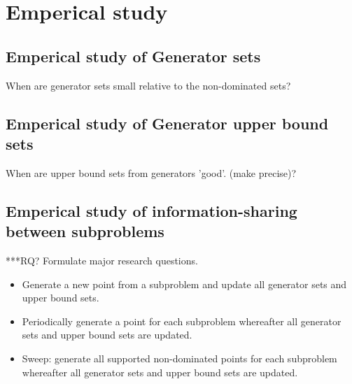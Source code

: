 \section{Emperical study}


\subsection{Emperical study of Generator sets}
When are generator sets small relative to the non-dominated sets?

\subsection{Emperical study of Generator upper bound sets}
When are upper bound sets from generators 'good'. (make precise)?


\subsection{Emperical study of information-sharing between subproblems}
***RQ? Formulate major research questions.

\begin{itemize}
	\item 
Generate a new point from a subproblem and update all generator sets and upper bound sets.
	\item 
Periodically generate a point for each subproblem whereafter all generator sets and upper bound sets are updated.
	\item 
Sweep: generate all supported non-dominated points for each subproblem whereafter all generator sets and upper bound sets are updated.
\end{itemize}
